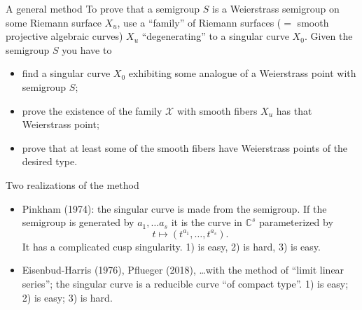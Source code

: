 \documentclass[12pt, aspectratio=169]{beamer}
\def\C{{\mathbb C}}
\begin{document}
\begin{frame}{A general method}
To prove that a semigroup $S$ is a Weierstrass semigroup on some
Riemann surface $X_{u}$, use a ``family'' of
Riemann surfaces  ($=$ smooth projective algebraic curves) $X_u$ ``degenerating'' to a singular curve $X_0$.
 Given the semigroup $S$ you
have to
\begin{itemize}
\item find a singular curve $X_0$ exhibiting some analogue of a Weierstrass point with semigroup $S$;
\item prove the existence of the family $\mathcal X$ with smooth fibers $X_u$ has that Weierstrass point;
\item prove that at least some of the smooth fibers have Weierstrass points of the desired type.

\end{itemize}

\end{frame}



\begin{frame}{Two realizations of the method}

\def\C{{\mathbb C}}
\begin{itemize}
 \item Pinkham (1974): the singular curve is made from the semigroup. If the
 semigroup is generated by $a_{1}, \dots a_{s}$ it is the 
 curve in $\C^{s}$ parameterized by
 $$
 t\mapsto (t^{a_{1}},\dots, t^{a_{s}}).
 $$
  It has a complicated cusp singularity. 1) is easy, 2) is hard, 3) is easy.

\item Eisenbud-Harris (1976), Pflueger (2018), \dots with the method of ``limit linear series''; the singular curve is a reducible curve ``of compact type''. 1) is easy; 2) is easy; 3) is hard.
\end{itemize}
\end{frame}
\end{document}
